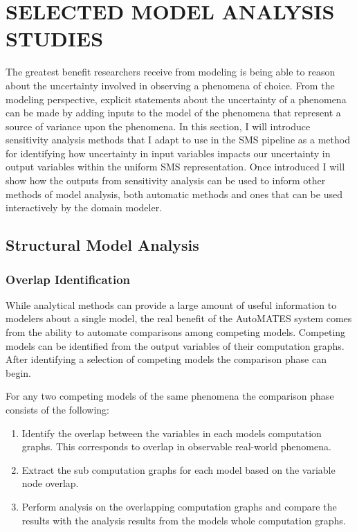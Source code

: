 \chapter{SELECTED MODEL ANALYSIS STUDIES\label{chapter:analysis_studies}}
The greatest benefit researchers receive from modeling is being able to reason about the uncertainty involved in observing a phenomena of choice.
From the modeling perspective, explicit statements about the uncertainty of a phenomena can be made by adding inputs to the model of the phenomena that represent a source of variance upon the phenomena.
In this section, I will introduce sensitivity analysis methods that I adapt to use in the SMS pipeline as a method for identifying how uncertainty in input variables impacts our uncertainty in output variables within the uniform SMS representation.
Once introduced I will show how the outputs from sensitivity analysis can be used to inform other methods of model analysis, both automatic methods and ones that can be used interactively by the domain modeler.

\section{Structural Model Analysis\label{sec:structural_analysis}}

\subsection{Overlap Identification\label{sec:overlap_identification}}
While analytical methods can provide a large amount of useful information to modelers about a single model, the real benefit of the AutoMATES system comes from the ability to automate comparisons among competing models. Competing models can be identified from the output variables of their computation graphs. After identifying a selection of competing models the comparison phase can begin.

For any two competing models of the same phenomena the comparison phase consists of the following:

\begin{enumerate}
  \item Identify the overlap between the variables in each models computation graphs. This corresponds to overlap in observable real-world phenomena.
  \item Extract the sub computation graphs for each model based on the variable node overlap.
  \item Perform analysis on the overlapping computation graphs and compare the results with the analysis results from the models whole computation graphs.
\end{enumerate}

